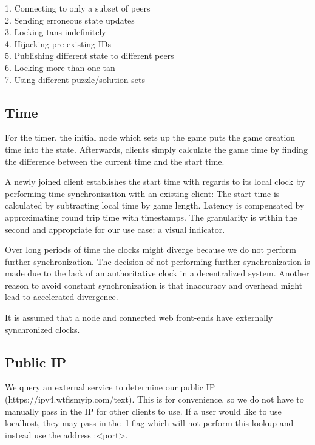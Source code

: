 \documentclass[twocolumn]{article}
\begin{document}
\begin{flushleft}
1. Connecting to only a subset of peers\\
2. Sending erroneous state updates\\
3. Locking tans indefinitely\\
4. Hijacking pre-existing IDs\\
5. Publishing different state to different peers\\
6. Locking more than one tan\\
7. Using different puzzle/solution sets
\end{flushleft}

\subsection{Time}
For the timer, the initial node which sets up the game puts the game creation time into the state. Afterwards, clients simply calculate the game time by finding the difference between the current time and the start time.

A newly joined client establishes the start time with regards to its local clock by performing time synchronization with an existing client: The start time is calculated by subtracting local time by game length. Latency is compensated by approximating round trip time with timestamps. The granularity is within the second and appropriate for our use case: a visual indicator.

Over long periods of time the clocks might diverge because we do not perform further synchronization. The decision of not performing further synchronization is made due to the lack of an authoritative clock in a decentralized system. Another reason to avoid constant synchronization is that inaccuracy and overhead might lead to accelerated divergence. 

It is assumed that a node and connected web front-ends have externally synchronized clocks.


\subsection{Public IP}
We query an external service to determine our public IP (https://ipv4.wtfismyip.com/text). This is for convenience, so we do not have to manually pass in the IP for other clients to use. If a user would like to use localhost, they may pass in the -l flag which will not perform this lookup and instead use the address :<port>.
\end{document}
